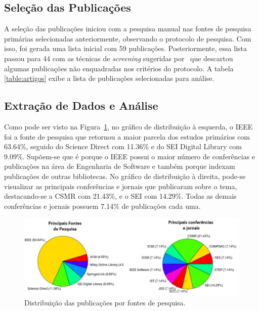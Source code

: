 \subsection{Seleção das Publicações}

A seleção das publicações iniciou com a pesquisa manual nas fontes de pesquisa primárias selecionadas anteriormente, 
observando o protocolo de pesquisa. Com isso, foi gerada uma lista inicial com 59 publicações. Posteriormente, essa lista passou 
para 44 com as técnicas de \textit{screening} sugeridas por~\cite{Petersen:2008} que descartou algumas publicações não 
enquadradas nos critérios do protocolo. A tabela \ref{table:artigos} exibe a lista de publicações selecionadas para análise.

\subsection{Extração de Dados e Análise}

Como pode ser visto na Figura~\ref{fig:grafico_distribuicao}, no gráfico de distribuição à esquerda, 
o \acrfull{IEEE} foi a fonte de pesquisa que retornou 
a maior parcela dos estudos primários com 63.64\%, seguido do Science Direct com 11.36\% e do SEI Digital Library com 9.09\%. 
Supõem-se que é porque o \acrshort{IEEE} possui o maior número de conferências e publicações na área de Engenharia de Software e 
também porque indexam publicações de outras bibliotecas. No gráfico de distribuição à direita, pode-se visualizar 
as principais conferências e jornais que publicaram sobre o tema, destacando-se 
a \acrfull{CSMR} com 21.43\%, e o \acrfull{SEI} com 14.29\%. Todas as demais conferências e jornais possuem 7.14\% de publicações cada uma. 

\begin{figure}
\centering
\includegraphics[scale=0.64]{img/mapeamento/grafico_distribuicao.pdf}
\caption{Distribuição das publicações por fontes de pesquisa.}
\label{fig:grafico_distribuicao}
\end{figure}


